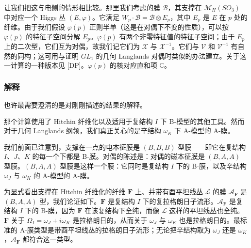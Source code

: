 \documentclass[11pt,a4paper]{article}
\begin{document}

让我们把这与电侧的情形相比较。那里我们考虑的膜 $\mathcal{B}$，其支撑在 $\mathcal{M}_H(SO_3)$ 中对应一个 Higgs 丛 $(E,\varphi)$。它满足
$W_p\cdot\mathcal{B}=\mathcal{B}\otimes E_p$，其中 $E_p$ 是 $E$ 在 $p$ 处的纤维。由于我们假设 $\varphi(p)$ 正则半单（这是在对偶下不变的性质），可以按 $\varphi(p)$ 的特征子空间分解 $E_p$。$\varphi(p)$ 有两个非零特征值的特征子空间；由于 $E_p$ 上的二次型，它们互为对偶，故我们记它们为 $\mathcal{X}$ 与 $\mathcal{X}^{-1}$。它们与 $\mathcal{V}$ 和 $\mathcal{V}^{-1}$ 有自然的同构；这可用与证明 $GL_1$ 的几何 Langlands 对偶时类似的办法建立。关于这一计算的一种版本见 [DP]。$\varphi(p)$ 的核对应直和项 $\mathbb{C}$。

\subsubsection{解释}

也许最需要澄清的是对刚刚描述的结果的解释。

那个计算使用了 Hitchin 纤维化以及适用于复结构 $I$ 下 B-模型的其他工具。然而对于几何 Langlands 纲领，我们真正关心的是辛结构 $\omega_K$ 下 A-模型的 A-膜。

我们前面已注意到，支撑在一点的电本征膜是 $(B,B,B)$ 型膜——即它在复结构 $I$、$J$、$K$ 的每一个下都是 B-膜。对偶的陈述是：对偶的磁本征膜是 $(B,A,A)$ 型膜。$(B,A,A)$ 型膜是这样一个膜：它同时是复结构 $I$ 下的 B-膜，以及辛结构 $\omega_J$ 与 $\omega_K$ 的 A-模型的 A-膜。

为显式看出支撑在 Hitchin 纤维化的纤维 $\boldsymbol{F}$ 上、并带有酉平坦线丛 $\mathcal{L}$ 的膜 $\mathcal{A}_{\boldsymbol{F}}$ 是 $(B,A,A)$ 型，我们论证如下。$\boldsymbol{F}$ 是复结构 $I$ 下的复拉格朗日子流形。$\mathcal{A}_{\boldsymbol{F}}$ 是复结构 $I$ 下的 B-膜，因为 $\boldsymbol{F}$ 在该复结构下全纯，而像 $\mathcal{L}$ 这样的平坦线丛也全纯。$\boldsymbol{F}$ 关于 $\Omega_I=\omega_J+i\omega_K$ 是拉格朗日的，从而关于 $\omega_J$ 与 $\omega_K$ 也是拉格朗日的。最标准的 A-膜类型是带酉平坦线丛的拉格朗日子流形；无论把辛结构取为 $\omega_J$ 还是 $\omega_K$，$\mathcal{A}_{\boldsymbol{F}}$ 都符合这一类型。
\end{document}
